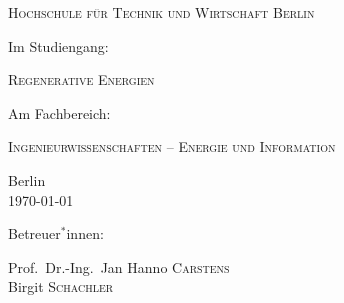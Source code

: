 \begin{titlepage}
	{\scshape\Large Hochschule für Technik und Wirtschaft Berlin \par}
	
	\vspace{1cm}
	
	Im Studiengang:\par
	{\scshape\large Regenerative Energien\par}
	
	\vspace{.5cm}
	
	Am Fachbereich:\par
	{\scshape\large Ingenieurwissenschaften {--} Energie und Information\par}
	
	\vfill
	
	{\large Berlin\\
	\today\par}
	
	\vfill
	
	{\large Betreuer$^*$innen:\par
	Prof.~Dr.-Ing.~Jan Hanno \textsc{Carstens}\\
	Birgit \textsc{Schachler}}
\end{titlepage}